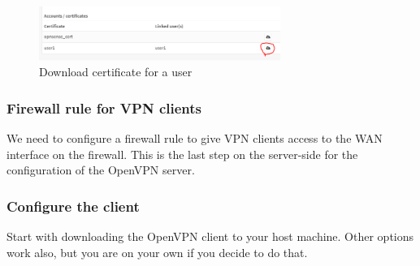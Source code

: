 \begin{figure}[h!]
    \centering
    \includegraphics[width=0.7\textwidth]{Images/vpn/user_download_cert.PNG}
    \caption{Download certificate for a user}
    \label{opnsense:vpn_cert_download}
\end{figure}

\subsubsection{Firewall rule for VPN clients}
We need to configure a firewall rule to give VPN clients access to the WAN interface on the firewall. This is the last step on the server-side for the configuration of the OpenVPN server.


\subsubsection{Configure the client}
Start with downloading the OpenVPN client to your host machine. Other options work also, but you are on your own if you decide to do that.



